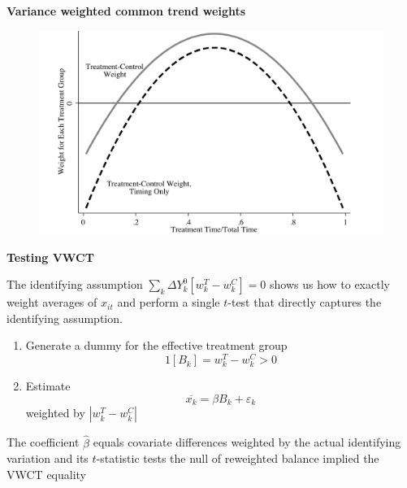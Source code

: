 \documentclass[notes=show]{beamer}
\begin{document}
\begin{frame}[plain]
\begin{center}
\textbf{Variance weighted common trend weights}
\end{center}

	\begin{figure}
	\includegraphics[scale=0.15]{./lecture_includes/vwct_weights.png}
	\end{figure}

\end{frame}



\begin{frame}[plain]
\begin{center}
\textbf{Testing VWCT}
\end{center}

The identifying assumption $ \sum_k \Delta Y^0_k [ w_k^T - w_k^C] = 0$ shows us how to exactly weight averages of $x_{it}$ and perform a single $t$-test that directly captures the identifying assumption.

\begin{enumerate}
\item Generate a dummy for the effective treatment group $$1[B_k] = w_k^T - w_k^C > 0$$
\item Estimate $$\overline{x_k} = \beta B_k + \varepsilon_k$$weighted by $|w_k^T - w_k^C|$
\end{enumerate}

The coefficient $\widehat{\beta}$ equals covariate differences weighted by the actual identifying variation and its $t$-statistic tests the null of reweighted balance implied the VWCT equality

\end{frame}
\end{document}
